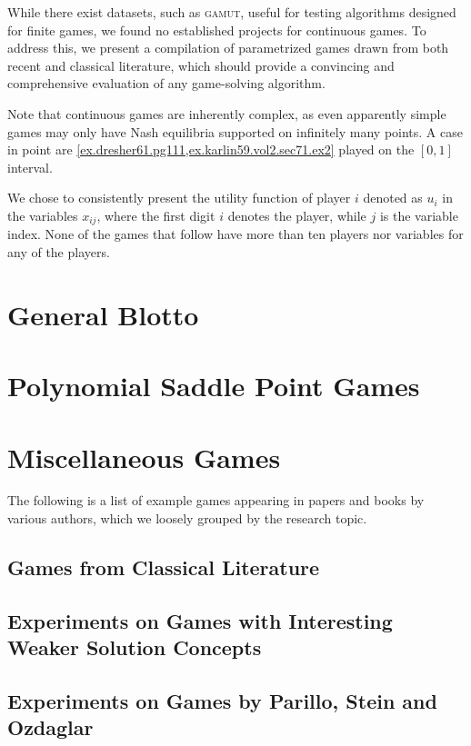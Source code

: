 \documentclass[../main.tex]{subfiles}
\begin{document}
While there exist datasets, such as \textsc{gamut}, useful for testing algorithms designed for finite games, we found no established projects for continuous games. To address this, we present a compilation of parametrized games drawn from both recent and classical literature, which should provide a convincing and comprehensive evaluation of any game-solving algorithm.

Note that continuous games are inherently complex, as even apparently simple games may only have Nash equilibria supported on infinitely many points. A case in point are \cref{ex.dresher61.pg111,ex.karlin59.vol2.sec71.ex2} played on the $[0,1]$ interval.

We chose to consistently present the utility function of player $i$ denoted as $u_i$ in the variables $x_{ij}$, where the first digit $i$ denotes the player, while $j$ is the variable index. None of the games that follow have more than ten players nor variables for any of the players.

\section{General Blotto}


\section{Polynomial Saddle Point Games}


\section{Miscellaneous Games}
The following is a list of example games appearing in papers and books by various authors, which we loosely grouped by the research topic.
\subsection{Games from Classical Literature}

\subsection{Experiments on Games with Interesting Weaker Solution Concepts}

\subsection{Experiments on Games by Parillo, Stein and Ozdaglar}

\end{document}

